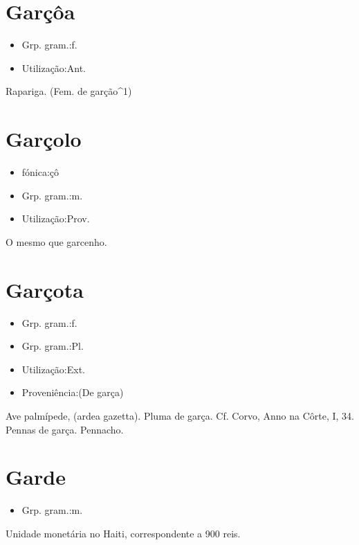 \section{Garçôa}
\begin{itemize}
\item {Grp. gram.:f.}
\end{itemize}
\begin{itemize}
\item {Utilização:Ant.}
\end{itemize}
Rapariga.
(Fem. de \textunderscore garção\textunderscore ^1)
\section{Garçolo}
\begin{itemize}
\item {fónica:çô}
\end{itemize}
\begin{itemize}
\item {Grp. gram.:m.}
\end{itemize}
\begin{itemize}
\item {Utilização:Prov.}
\end{itemize}
O mesmo que \textunderscore garcenho\textunderscore .
\section{Garçota}
\begin{itemize}
\item {Grp. gram.:f.}
\end{itemize}
\begin{itemize}
\item {Grp. gram.:Pl.}
\end{itemize}
\begin{itemize}
\item {Utilização:Ext.}
\end{itemize}
\begin{itemize}
\item {Proveniência:(De \textunderscore garça\textunderscore )}
\end{itemize}
Ave palmípede, (\textunderscore ardea gazetta\textunderscore ).
Pluma de garça. Cf. Corvo, \textunderscore Anno na Côrte\textunderscore , I, 34.
Pennas de garça.
Pennacho.
\section{Garde}
\begin{itemize}
\item {Grp. gram.:m.}
\end{itemize}
Unidade monetária no Haiti, correspondente a 900 reis.
